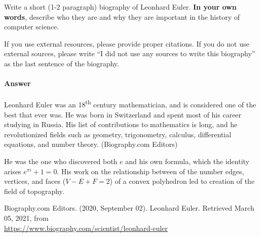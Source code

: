 \documentclass{article}
\begin{document}

Write a short (1-2 paragraph) biography of Leonhard Euler.
\textbf{In your own words}, describe who they are and why they are important in
the history of computer science.

If you use external resources, please provide
proper citations. If you do not use external sources, please write ``I did not
use any sources to write this biography'' as the last sentence of the
biography.

\paragraph{Answer}

Leonhard Euler was an 18\textsuperscript{th} century mathematician, and is considered one of the best that 
ever was. He was born in Switzerland and spent most of his career studying in Russia.
His list of contributions to mathematics is long, and he revolutionized fields such as geometry, 
trigonometry, calculus, differential equations, and number theory. (Biography.com Editors)

He was the one who discovered both $e$ and his own formula, which the identity arises $e^{\pi i}+1=0$.
His work on the relationship between of the number edges, vertices, and faces ($V - E + F = 2$) of a convex polyhedron led to
creation of the field of topography.

Biography.com Editors. (2020, September 02). Leonhard Euler. Retrieved March 05, 2021, from \\
\url{https://www.biography.com/scientist/leonhard-euler}
% 
% 
\end{document}
